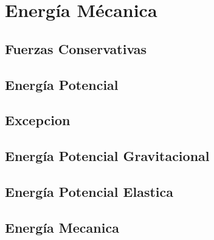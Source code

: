 \chapter{Energía Mécanica}

\section{Fuerzas Conservativas}

\newpage
\section{Energía Potencial}

\newpage
\section{Excepcion}

\newpage
\section{Energía Potencial Gravitacional}

\newpage
\section{Energía Potencial Elastica}

\newpage
\section{Energía Mecanica}